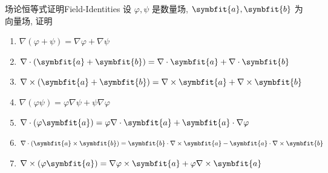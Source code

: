 \begin{problem}{场论恒等式证明}{Field-Identities}
    设 $\varphi, \psi$ 是数量场, $\symbfit{a}, \symbfit{b}$ 为向量场, 证明
    \begin{enumerate}
        \item $\nabla(\varphi + \psi) = \nabla \varphi + \nabla \psi$
        \item $\nabla \cdot (\symbfit{a} + \symbfit{b}) = \nabla \cdot \symbfit{a} + \nabla \cdot \symbfit{b}$
        \item $\nabla \times (\symbfit{a} + \symbfit{b}) = \nabla \times \symbfit{a} + \nabla \times \symbfit{b}$
        \item $\nabla(\varphi \psi) = \varphi \nabla \psi + \psi \nabla \varphi$
        \item $\nabla \cdot (\varphi \symbfit{a}) = \varphi \nabla \cdot \symbfit{a} + \symbfit{a} \cdot \nabla \varphi$
        \item $\nabla \cdot (\symbfit{a} \times \symbfit{b}) = \symbfit{b} \cdot \nabla \times \symbfit{a} - \symbfit{a} \cdot \nabla \times \symbfit{b}$
        \item $\nabla \times (\varphi \symbfit{a}) = \nabla \varphi \times \symbfit{a} + \varphi \nabla \times \symbfit{a}$
    \end{enumerate}
\end{problem}

